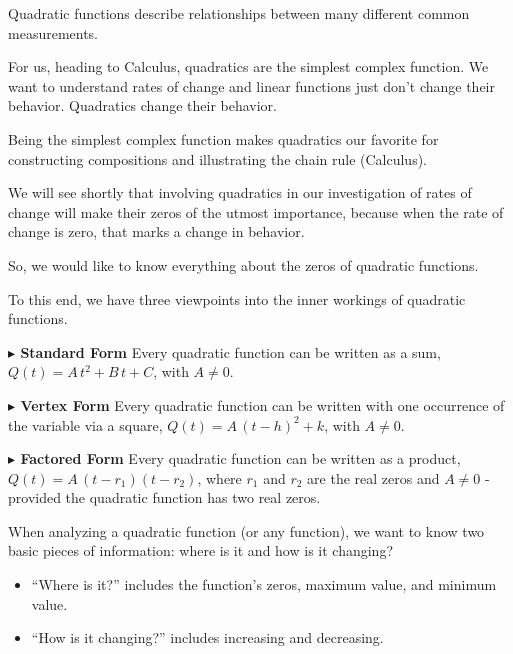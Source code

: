 \documentclass{ximera}
\begin{document}
Quadratic functions describe relationships between many different common measurements. 

For us, heading to Calculus, quadratics are the simplest complex function.  We want to understand rates of change and linear functions just don't change their behavior. Quadratics change their behavior. 


Being the simplest complex function makes quadratics our favorite for constructing compositions and illustrating the chain rule (Calculus). 

We will see shortly that involving quadratics in our investigation of rates of change will make their zeros of the utmost importance, because when the rate of change is zero, that marks a change in behavior. 


So, we would like to know everything about the zeros of quadratic functions. 



To this end, we have three viewpoints into the inner workings of quadratic functions.



\textbf{\textcolor{red!70!darkgray}{$\blacktriangleright$ Standard Form}} Every quadratic function can be written as a sum, $Q(t) = A \, t^2 + B \, t + C$, with $A \ne 0$. 



\textbf{\textcolor{red!70!darkgray}{$\blacktriangleright$ Vertex Form}} Every quadratic function can be written with one occurrence of the variable via a square, $Q(t) = A \, (t - h)^2 + k$, with $A \ne 0$. 



\textbf{\textcolor{red!70!darkgray}{$\blacktriangleright$ Factored Form}} Every quadratic function can be written as a product, $Q(t) = A \, (t - r_1)(t - r_2)$, where $r_1$ and $r_2$ are the real zeros and $A \ne 0$ - provided the quadratic function has two real zeros. 











When analyzing a quadratic function (or any function), we want to know two basic pieces of information: where is it and how is it changing? 


\begin{itemize}
\item ``Where is it?'' includes the function's zeros, maximum value, and minimum value.
\item ``How is it changing?'' includes increasing and decreasing.
\end{itemize}
\end{document}
